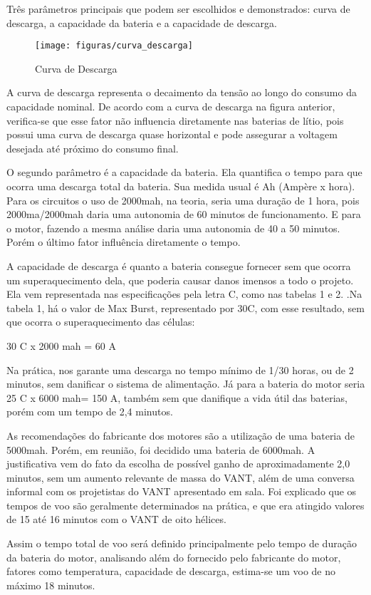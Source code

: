 Três parâmetros principais que podem ser escolhidos e demonstrados: curva de descarga, a capacidade da bateria e a capacidade de descarga.

\begin{figure}[H]
\centering\texttt{[image: figuras/curva\_descarga]}
\caption{Curva de Descarga \cite{riobotz2006}}
\end{figure}

A curva de descarga representa o decaimento da tensão ao longo do consumo da capacidade nominal. De acordo com a curva de descarga na figura anterior, verifica-se que esse fator não influencia diretamente nas baterias de lítio, pois possui uma curva de descarga quase horizontal e pode assegurar a voltagem desejada até próximo do consumo final.\cite{riobotz2006}

O segundo parâmetro é a capacidade da bateria. Ela quantifica o tempo para que ocorra uma descarga total da bateria. Sua medida usual é Ah (Ampère x hora). \cite{riobotz2006} Para os circuitos o uso de 2000mah, na teoria, seria uma duração de 1 hora, pois 2000ma/2000mah daria uma autonomia de 60 minutos de funcionamento. E para o motor, fazendo a mesma análise daria uma autonomia de 40 a 50 minutos. Porém o último fator influência diretamente o tempo.

A capacidade de descarga é quanto a bateria consegue fornecer sem que ocorra um superaquecimento dela, que poderia causar danos imensos a todo o projeto. Ela vem representada nas especificações pela letra C, como nas tabelas 1 e 2. \cite{riobotz2006}.Na tabela 1, há o valor de Max Burst, representado por 30C, com esse resultado, sem que ocorra o superaquecimento das células:

\begin{center}
30 C x 2000 mah = 60 A
\end{center}

Na prática, nos garante uma descarga no tempo mínimo de 1/30 horas, ou de 2 minutos, sem danificar o sistema de alimentação. Já para a bateria do motor seria 25 C x 6000 mah= 150 A, também sem que danifique a vida útil das baterias, porém com um tempo de 2,4 minutos. \cite{riobotz2006}

As recomendações do fabricante dos motores são a utilização de uma bateria de 5000mah. \cite{highpower2014} Porém, em reunião, foi decidido uma bateria de 6000mah. A justificativa vem do fato da escolha de possível ganho de aproximadamente 2,0 minutos, sem um aumento relevante de massa do VANT, além de uma conversa informal com os projetistas do VANT apresentado em sala. Foi explicado que os tempos de voo são geralmente determinados na prática, e que era atingido valores de 15 até 16 minutos com o VANT de oito hélices. \cite{nocoes2005}

Assim o tempo total de voo será definido principalmente pelo tempo de duração da bateria do motor, analisando além do fornecido pelo fabricante do motor, fatores como temperatura, capacidade de descarga, estima-se um voo de no máximo 18 minutos.
